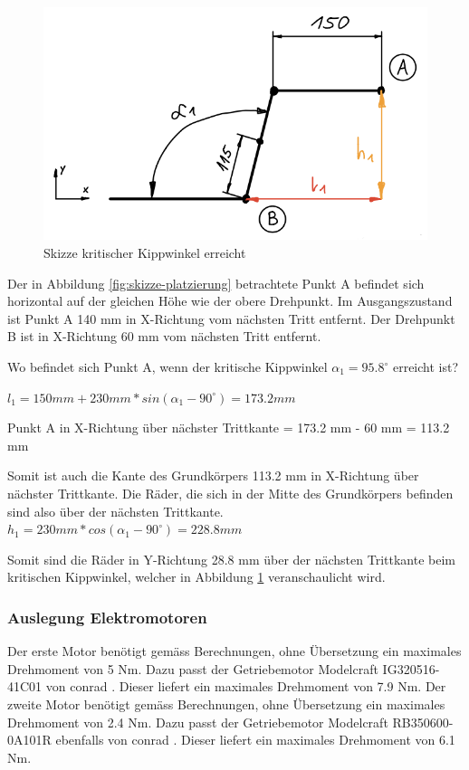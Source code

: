 \begin{figure}[H]
  \includegraphics[width=0.6
  \textwidth]{img/Treppensteigen/Analyse 1.png}
  \centering
  \caption{Skizze kritischer Kippwinkel erreicht}
  \label{fig:kritischer-kippwinkel}
\end{figure}

Der in Abbildung \ref{fig:skizze-platzierung} betrachtete Punkt A befindet sich horizontal auf der gleichen Höhe wie der obere Drehpunkt. Im Ausgangszustand ist Punkt A 140 mm in X-Richtung vom nächsten Tritt entfernt. Der Drehpunkt B ist in X-Richtung 60 mm vom nächsten Tritt entfernt.

Wo befindet sich Punkt A, wenn der kritische Kippwinkel \(\alpha_{1} = 95.8^\circ\) erreicht ist?

\(l_{1} = 150 mm + 230 mm * sin(\alpha_{1} - 90^\circ) = 173.2 mm\)

Punkt A in X-Richtung über nächster Trittkante = 173.2 mm - 60 mm = 113.2 mm

Somit ist auch die Kante des Grundkörpers 113.2 mm in X-Richtung über nächster Trittkante.
Die Räder, die sich in der Mitte des Grundkörpers befinden sind also über der nächsten Trittkante.\\

\(h_{1} = 230 mm * cos(\alpha_{1} - 90^\circ) = 228.8 mm\)

Somit sind die Räder in Y-Richtung 28.8 mm über der nächsten Trittkante beim kritischen Kippwinkel, welcher in Abbildung \ref{fig:kritischer-kippwinkel} veranschaulicht wird.\\


\newpage
\subsubsection{Auslegung Elektromotoren}
Der erste Motor benötigt gemäss Berechnungen, ohne Übersetzung ein maximales Drehmoment von 5 Nm. Dazu passt der Getriebemotor Modelcraft IG320516-41C01 von conrad \cite{Getriebemotor1}. Dieser liefert ein maximales Drehmoment von 7.9 Nm. 
Der zweite Motor benötigt gemäss Berechnungen, ohne Übersetzung ein maximales Drehmoment von 2.4 Nm. Dazu passt der Getriebemotor Modelcraft RB350600-0A101R ebenfalls von conrad \cite{Getriebemotor2}. Dieser liefert ein maximales Drehmoment von 6.1 Nm.

